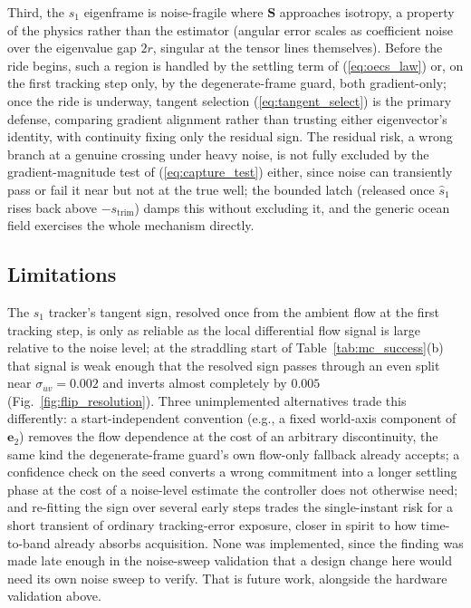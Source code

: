 \documentclass[lettersize,journal]{IEEEtran}
\begin{document}
Third, the $s_1$ eigenframe is noise-fragile where $\mathbf{S}$
approaches isotropy, a property of the physics rather than the
estimator (angular error scales as coefficient noise over the
eigenvalue gap $2r$, singular at the tensor lines themselves).
Before the ride begins, such a region
is handled by the settling term of (\ref{eq:oecs_law}) or, on the first
tracking step only, by the degenerate-frame guard, both gradient-only;
once the ride is underway, tangent selection
(\ref{eq:tangent_select}) is the primary defense, comparing gradient
alignment rather than trusting either eigenvector's identity, with
continuity fixing only the residual sign. The residual risk, a wrong
branch at a genuine crossing under heavy noise, is not fully excluded
by the gradient-magnitude test of (\ref{eq:capture_test}) either, since noise can
transiently pass or fail it near but not at the true well; the bounded
latch (released once $\hat{s}_1$ rises back above $-s_{\text{trim}}$)
damps this without excluding it, and the generic ocean field exercises
the whole mechanism directly.

\subsection{Limitations}
\label{sec:limitations}

The $s_1$ tracker's tangent sign, resolved once from the ambient flow
at the first tracking step, is only
as reliable as the local differential flow signal is large relative to
the noise level; at the straddling start of Table~\ref{tab:mc_success}(b)
that signal is weak enough that the resolved sign passes through an even
split near $\sigma_{uv} = 0.002$ and inverts almost completely by
$0.005$ (Fig.~\ref{fig:flip_resolution}). Three
unimplemented alternatives trade this differently: a start-independent
convention (e.g., a fixed world-axis component of $\mathbf{e}_2$)
removes the flow dependence at the cost of an arbitrary discontinuity,
the same kind the degenerate-frame guard's own flow-only fallback
already accepts; a
confidence check on the seed converts a wrong commitment into a longer
settling phase at the cost of a noise-level estimate the controller does
not otherwise need; and re-fitting the sign over several early steps
trades the single-instant risk for a short transient of ordinary
tracking-error exposure, closer in spirit to how time-to-band already
absorbs acquisition. None was implemented, since the finding was made
late enough in the noise-sweep validation that a design change here
would need its own noise sweep to verify. That is future work, alongside
the hardware validation above.
\end{document}
